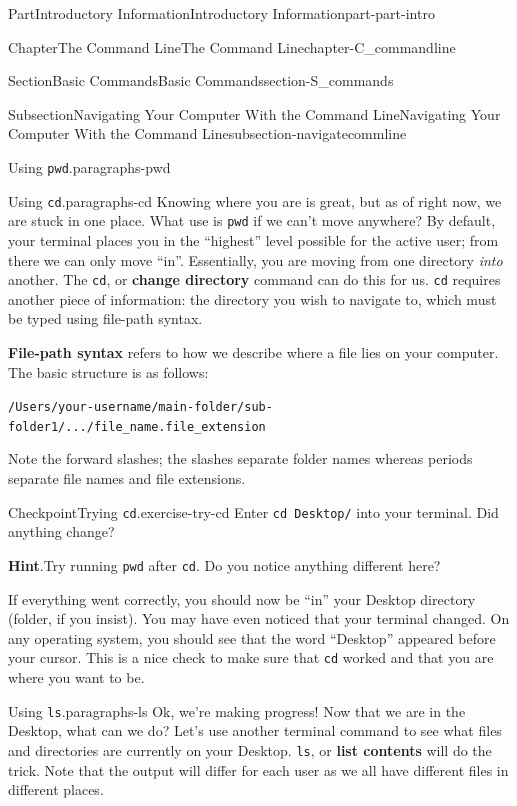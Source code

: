 \documentclass[oneside,10pt,]{book}
\newcommand{\blocktitlefont}{\relax}
\newcommand{\mono}[1]{\texttt{#1}}
\newcommand{\terminology}[1]{\textbf{#1}}
\begin{document}
\begin{partptx}{Part}{Introductory Information}{}{Introductory Information}{}{}{part-part-intro}
\begin{chapterptx}{Chapter}{The Command Line}{}{The Command Line}{}{}{chapter-C_commandline}
\begin{sectionptx}{Section}{Basic Commands}{}{Basic Commands}{}{}{section-S_commands}
\begin{subsectionptx}{Subsection}{Navigating Your Computer With the Command Line}{}{Navigating Your Computer With the Command Line}{}{}{subsection-navigatecommline}
\begin{paragraphs}{Using \mono{pwd}.}{paragraphs-pwd}
\end{paragraphs}%
\begin{paragraphs}{Using \mono{cd}.}{paragraphs-cd}%
\index{\mono{cd}}%
%
%
%
\index{command line!\mono{cd}}%
Knowing where you are is great, but as of right now, we are stuck in one place. What use is \mono{pwd} if we can't move anywhere? By default, your terminal places you in the ``highest'' level possible for the active user; from there we can only move ``in''. Essentially, you are moving from one directory \emph{into} another. The \mono{cd}, or \terminology{change directory} command can do this for us. \mono{cd} requires another piece of information: the directory you wish to navigate to, which must be typed using file-path syntax.%
\par
\terminology{File-path syntax} refers to how we describe where a file lies on your computer. The basic structure is as follows:%
\par
\mono{/Users/your-username/main-folder/sub-folder1/.../file\_name.file\_extension}%
\par
Note the forward slashes; the slashes separate folder names whereas periods separate file names and file extensions.%
\begin{inlineexercise}{Checkpoint}{Trying \mono{cd}.}{exercise-try-cd}%
Enter \mono{cd Desktop/} into your terminal. Did anything change?%
\par\smallskip%
\noindent\textbf{\blocktitlefont Hint}.\hypertarget{hint-try-cd-c}{}\quad{}Try running \mono{pwd} after \mono{cd}. Do you notice anything different here?%
\end{inlineexercise}%
If everything went correctly, you should now be ``in'' your Desktop directory (folder, if you insist). You may have even noticed that your terminal changed. On any operating system, you should see that the word ``Desktop'' appeared before your cursor. This is a nice check to make sure that \mono{cd} worked and that you are where you want to be.%
\end{paragraphs}%
\begin{paragraphs}{Using \mono{ls}.}{paragraphs-ls}%
\index{command line!\mono{ls}}%
\index{\mono{ls}}%
%
Ok, we're making progress! Now that we are in the Desktop, what can we do? Let's use another terminal command to see what files and directories are currently on your Desktop. \mono{ls}, or \terminology{list contents} will do the trick. Note that the output will differ for each user as we all have different files in different places.%

\end{paragraphs}
\end{subsectionptx}
\end{sectionptx}
\end{chapterptx}
\end{partptx}
\end{document}
